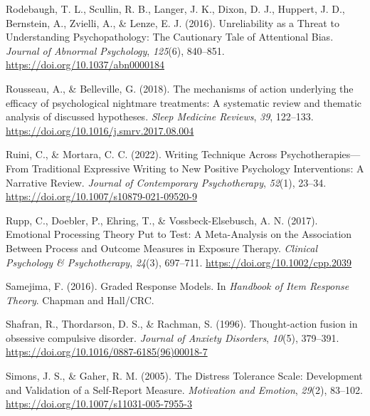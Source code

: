 \documentclass[
  man,floatsintext]{apa7}
\newlength{\cslhangindent}
\newlength{\cslentryspacingunit} %
\newenvironment{CSLReferences}[2] %
 {%
  \setlength{\parindent}{0pt}
  \ifodd #1
  \let\oldpar\par
  \def\par{\hangindent=\cslhangindent\oldpar}
  \fi
  \setlength{\parskip}{#2\cslentryspacingunit}
 }%
 {}
\begin{document}
\begin{CSLReferences}{1}{0}
\leavevmode{}%
Rodebaugh, T. L., Scullin, R. B., Langer, J. K., Dixon, D. J., Huppert, J. D., Bernstein, A., Zvielli, A., \& Lenze, E. J. (2016). Unreliability as a Threat to Understanding Psychopathology: The Cautionary Tale of Attentional Bias. \emph{Journal of Abnormal Psychology}, \emph{125}(6), 840--851. \url{https://doi.org/10.1037/abn0000184}

\leavevmode{}%
Rousseau, A., \& Belleville, G. (2018). The mechanisms of action underlying the efficacy of psychological nightmare treatments: A systematic review and thematic analysis of discussed hypotheses. \emph{Sleep Medicine Reviews}, \emph{39}, 122--133. \url{https://doi.org/10.1016/j.smrv.2017.08.004}

\leavevmode{}%
Ruini, C., \& Mortara, C. C. (2022). Writing Technique Across Psychotherapies---From Traditional Expressive Writing to New Positive Psychology Interventions: A Narrative Review. \emph{Journal of Contemporary Psychotherapy}, \emph{52}(1), 23--34. \url{https://doi.org/10.1007/s10879-021-09520-9}

\leavevmode{}%
Rupp, C., Doebler, P., Ehring, T., \& Vossbeck-Elsebusch, A. N. (2017). Emotional Processing Theory Put to Test: A Meta-Analysis on the Association Between Process and Outcome Measures in Exposure Therapy. \emph{Clinical Psychology \& Psychotherapy}, \emph{24}(3), 697--711. \url{https://doi.org/10.1002/cpp.2039}

\leavevmode{}%
Samejima, F. (2016). Graded Response Models. In \emph{Handbook of Item Response Theory}. Chapman and Hall/CRC.

\leavevmode{}%
Shafran, R., Thordarson, D. S., \& Rachman, S. (1996). Thought-action fusion in obsessive compulsive disorder. \emph{Journal of Anxiety Disorders}, \emph{10}(5), 379--391. \url{https://doi.org/10.1016/0887-6185(96)00018-7}

\leavevmode{}%
Simons, J. S., \& Gaher, R. M. (2005). The Distress Tolerance Scale: Development and Validation of a Self-Report Measure. \emph{Motivation and Emotion}, \emph{29}(2), 83--102. \url{https://doi.org/10.1007/s11031-005-7955-3}


\end{CSLReferences}
\end{document}
